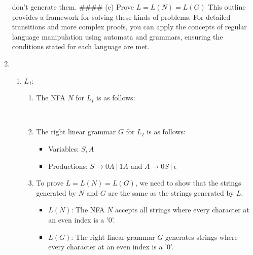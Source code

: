 \documentclass[a4paper]{article}
\begin{document}
\begin{enumerate}
don't generate them. #### (c) Prove \( L = L(N) = L(G) \) This outline provides a framework for solving these kinds of problems. For detailed transitions and more complex proofs, you can apply the concepts of regular language manipulation using automata and grammars, ensuring the conditions stated for each language are met.
        \item \begin{enumerate}[label=\arabic*)]
            \item $L_I$:\\
            \begin{enumerate}[label=(\alph*)]
                \item The NFA $N$ for $L_I$ is as follows: \\
                 \\

                \item The right linear grammar $G$ for $L_I$ is as follows: \\
                \begin{itemize}
                    \item Variables: $S, A$
                    \item Productions: $S \rightarrow 0A \ | \ 1A$ and $A \rightarrow 0S \ | \ \epsilon$
                \end{itemize}

                \item To prove $L = L(N) = L(G)$, we need to show that the strings generated by $N$ and $G$ are the same as the strings generated by $L$. \\
                \begin{itemize}
                    \item $L(N)$: The NFA $N$ accepts all strings where every character at an even index is a '0'.
                    \item $L(G)$: The right linear grammar $G$ generates strings where every character at an even index is a '0'. \\ \\
                \end{itemize}
            \end{enumerate}


\end{enumerate}
\end{enumerate}
\end{document}
